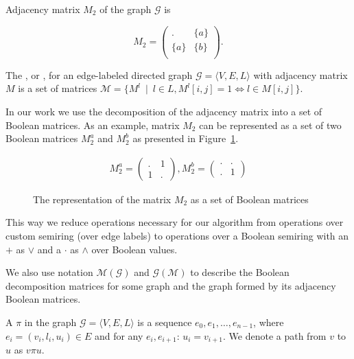 Adjacency matrix $M_2$ of the graph $\mathcal{G}$ is 

$$
    M_2 =
    \begin{pmatrix}
    . & \{a\}     \\
   \{a\}   &   \{b\}     \\
    \end{pmatrix}.
$$

\begin{definition}
The , or ,
for an edge-labeled directed graph $\mathcal{G} = 
\langle V,E,L \rangle$ with adjacency matrix $M$ is a set of matrices $\mathcal{M} = \{ M^l~\mid~l \in L,M^l[i,j] = 1 \iff l \in M[i,j]\}$.
\end{definition}

In our work we use the decomposition of the adjacency matrix into a set of Boolean matrices. As an example, matrix $M_2$ can be represented as a set of two Boolean matrices $M_2^a$ and $M_2^b$ as presented in Figure~\ref{fig:boolean_decomposition_of_graph}.

\begin{figure}[h]
    \centering
\begin{align}
M_2^{a} =
\begin{pmatrix}
    . & 1     \\
    1 & .   
\end{pmatrix}, 
M_2^{b} =
\begin{pmatrix}      
    . & .    \\
    . & 1
\end{pmatrix}
\end{align}
   \caption{The representation of the matrix $M_2$ as a set of Boolean matrices}
\label{fig:boolean_decomposition_of_graph}
\end{figure}

This way we reduce operations necessary for our algorithm from
operations over custom semiring (over edge labels) to operations over a Boolean semiring with an  $+$ as $\lor$ and a  $\cdot$ as $\land$ over Boolean values.

We also use notation $\mathcal{M}(\mathcal{G})$ and $\mathcal{G}(\mathcal{M})$ to describe the Boolean decomposition matrices for some graph and the graph formed by its adjacency Boolean matrices.

\begin{definition}
A  $\pi$ in the graph $\mathcal{G} = \langle V,E,L \rangle$ is a sequence $e_0,e_1,\ldots,e_{n-1}$, where $e_i = (v_i,l_i,u_i) \in E$ and for any $e_i, e_{i+1}$: $u_i = v_{i+1}$. We denote a path from $v$ to $u$ as $v\pi u$.
\end{definition}

